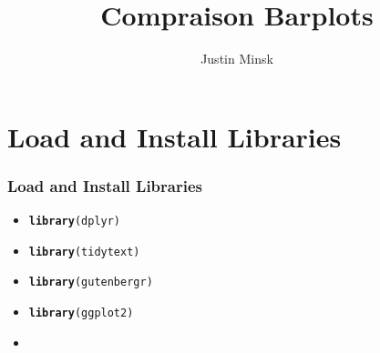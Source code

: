 \documentclass{beamer}\usepackage[]{graphicx}\usepackage[]{color}
\makeatletter
\newcommand{\hlstd}[1]{\textcolor[rgb]{0.345,0.345,0.345}{#1}}%
\newcommand{\hlkwd}[1]{\textcolor[rgb]{0.737,0.353,0.396}{\textbf{#1}}}%
\newenvironment{kframe}{%
 \def\at@end@of@kframe{}%
 \ifinner\ifhmode%
  \def\at@end@of@kframe{\end{minipage}}%
  \begin{minipage}{\columnwidth}%
 \fi\fi%
 \def\FrameCommand##1{\hskip\@totalleftmargin \hskip-\fboxsep
 \colorbox{shadecolor}{##1}\hskip-\fboxsep
     \hskip-\linewidth \hskip-\@totalleftmargin \hskip\columnwidth}%
 \MakeFramed {\advance\hsize-\width
   \@totalleftmargin\z@ \linewidth\hsize
   \@setminipage}}%
 {\par\unskip\endMakeFramed%
 \at@end@of@kframe}
\newenvironment{knitrout}{}{} %
\makeatother
\begin{document}
\title{Compraison Barplots}
\author{Justin Minsk}

\begin{frame}
  \titlepage
\end{frame}

\section{Load and Install Libraries}
\begin{frame}[fragile]
  \frametitle{Load and Install Libraries}
    \begin{itemize}
      \item<1->
\begin{knitrout}
\color{fgcolor}\begin{kframe}
\begin{alltt}
\hlkwd{library}\hlstd{(dplyr)}
\end{alltt}
\end{kframe}
\end{knitrout}
      \item<2->
\begin{knitrout}
\color{fgcolor}\begin{kframe}
\begin{alltt}
\hlkwd{library}\hlstd{(tidytext)}
\end{alltt}
\end{kframe}
\end{knitrout}
      \item<3->
\begin{knitrout}
\color{fgcolor}\begin{kframe}
\begin{alltt}
\hlkwd{library}\hlstd{(gutenbergr)}
\end{alltt}
\end{kframe}
\end{knitrout}
      \item<4->
\begin{knitrout}
\color{fgcolor}\begin{kframe}
\begin{alltt}
\hlkwd{library}\hlstd{(ggplot2)}
\end{alltt}
\end{kframe}
\end{knitrout}
      \item<5->
\begin{knitrout}

\end{knitrout}
\end{itemize}
\end{frame}
\end{document}
